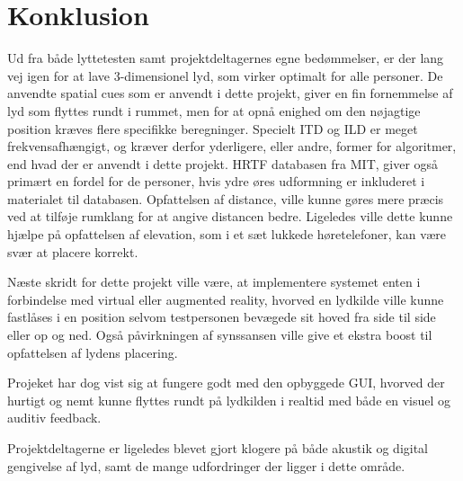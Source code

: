 \chapter{Konklusion}

Ud fra både lyttetesten samt projektdeltagernes egne bedømmelser, er der lang vej igen for at lave 3-dimensionel lyd, som virker optimalt for alle personer. De anvendte spatial cues som er anvendt i dette projekt, giver en fin fornemmelse af lyd som flyttes rundt i rummet, men for at opnå enighed om den nøjagtige position kræves flere specifikke beregninger. 
Specielt ITD og ILD er meget frekvensafhængigt, og kræver derfor yderligere, eller andre, former for algoritmer, end hvad der er anvendt i dette projekt. HRTF databasen fra MIT, giver også primært en fordel for de personer, hvis ydre øres udformning er inkluderet i materialet til databasen.
Opfattelsen af distance, ville kunne gøres mere præcis ved at tilføje rumklang for at angive distancen bedre. Ligeledes ville dette kunne hjælpe på opfattelsen af elevation, som i et sæt lukkede høretelefoner, kan være svær at placere korrekt.

Næste skridt for dette projekt ville være, at implementere systemet enten i forbindelse med virtual eller augmented reality, hvorved en lydkilde ville kunne fastlåses i en position selvom testpersonen bevægede sit hoved fra side til side eller op og ned. Også påvirkningen af synssansen ville give et ekstra boost til opfattelsen af lydens placering.

Projeket har dog vist sig at fungere godt med den opbyggede GUI, hvorved der hurtigt og nemt kunne flyttes rundt på lydkilden i realtid med både en visuel og auditiv feedback. 

Projektdeltagerne er ligeledes blevet gjort klogere på både akustik og digital gengivelse af lyd, samt de mange udfordringer der ligger i dette område.